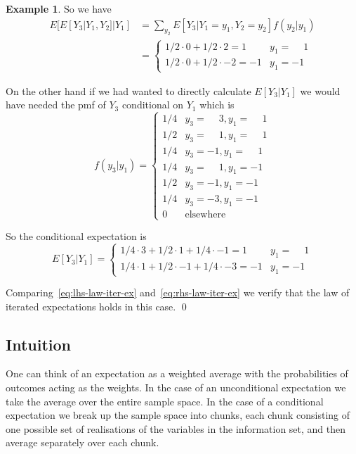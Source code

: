 \documentclass[11pt,reqno,openany]{amsbook}
\theoremstyle{plain}
\theoremstyle{definition}
\newtheorem{exmp}{Example}[chapter]
\begin{document}
\begin{exmp}
So we have
\begin{align}\label{eq:lhs-law-iter-ex}
E[E[Y_3|Y_1,Y_2]|Y_1]&=\sum_{y_2}E[Y_3|Y_1=y_1,Y_2=y_2]f(y_2|y_1)\\
&=\begin{cases}
1/2\cdot 0+1/2 \cdot 2=1 & y_1=\phantom{-}1\\
1/2\cdot 0+1/2\cdot -2=-1 &y_1=-1
\end{cases}
\end{align}

On the other hand if we had wanted to directly calculate $E[Y_3|Y_1]$
we would have needed the pmf of $Y_3$ conditional on $Y_1$ which is
\[f(y_3|y_1)=
\begin{cases}
1/4 & y_3=\phantom{-}3,y_1=\phantom{-}1\\
1/2 & y_3=\phantom{-}1,y_1=\phantom{-}1\\
1/4 & y_3=-1,y_1=\phantom{-}1\\
1/4 & y_3=\phantom{-}1,y_1=-1\\
1/2 & y_3=-1,y_1=-1\\
1/4 & y_3=-3,y_1=-1\\
0 & \text{elsewhere}
\end{cases}\]

So the conditional expectation is
\begin{equation}\label{eq:rhs-law-iter-ex}
E[Y_3|Y_1]=\begin{cases}
1/4\cdot 3+1/2 \cdot 1 +1/4\cdot -1 =1&y_1=\phantom{-}1\\
1/4\cdot 1+1/2 \cdot -1+1/4\cdot -3 =-1&y_1=-1
\end{cases}
\end{equation}

Comparing~\eqref{eq:lhs-law-iter-ex} and~\eqref{eq:rhs-law-iter-ex} we
verify that the law of iterated expectations holds in this case.
\qed
\end{exmp}

\subsection{Intuition}
One can think of an expectation as a weighted average with the
probabilities of outcomes acting as the weights. In the case of an
unconditional expectation we take the average over the entire sample
space. In the case of a conditional expectation we break up the sample
space into chunks, each chunk consisting of one possible set of
realisations of the variables in the information set, and then average
separately over each chunk. 
\end{document}
